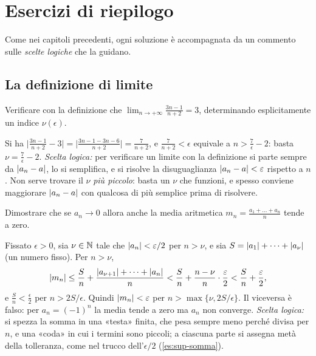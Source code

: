\section{Esercizi di riepilogo}
\label{sec:esercizi-cap3}

Come nei capitoli precedenti, ogni soluzione è accompagnata da un commento sulle
\emph{scelte logiche} che la guidano.

\subsection*{La definizione di limite}

\begin{esercizio}
Verificare con la definizione che $\displaystyle\lim_{n\to+\infty}\frac{3n-1}{n+2}=3$,
determinando esplicitamente un indice $\nu(\epsilon)$.
\begin{soluzione}
Si ha $\bigl|\frac{3n-1}{n+2}-3\bigr|=\bigl|\frac{3n-1-3n-6}{n+2}\bigr|=\frac7{n+2}$, e
$\frac7{n+2}<\epsilon$ equivale a $n>\frac7\epsilon-2$: basta $\nu=\frac7\epsilon-2$.
\emph{Scelta logica:} per verificare un limite con la definizione si parte sempre da
$\lvert a_{n}-a\rvert$, lo si semplifica, e si risolve la disuguaglianza $\lvert a_{n}-a\rvert<\varepsilon$
rispetto a $n$. Non serve trovare il $\nu$ \emph{più piccolo}: basta un $\nu$ che funzioni,
e spesso conviene maggiorare $\lvert a_{n}-a\rvert$ con qualcosa di più semplice prima di
risolvere.
\end{soluzione}
\end{esercizio}

\begin{esercizio}
Dimostrare che se $a_{n}\to0$ allora anche la media aritmetica
$m_{n}=\frac{a_{1}+\dots+a_{n}}{n}$ tende a zero.
\begin{soluzione}
Fissato $\epsilon>0$, sia $\nu\in\mathbb{N}$ tale che $\lvert a_{n}\rvert<\varepsilon/2$ per $n>\nu$, e sia
$S=\lvert a_{1}\rvert+\dots+\lvert a_{\nu}\rvert$ (un numero fisso). Per $n>\nu$,
\[
  \lvert m_{n}\rvert\le\frac{S}{n}+\frac{\lvert a_{\nu+1}\rvert+\dots+\lvert a_{n}\rvert}{n}
  <\frac Sn+\frac{n-\nu}{n}\cdot\frac{\varepsilon}2<\frac Sn+\frac{\varepsilon}2,
\]
e $\frac Sn<\frac\epsilon2$ per $n>2S/\epsilon$. Quindi $\lvert m_{n}\rvert<\varepsilon$ per
$n>\max\{\nu,2S/\epsilon\}$. Il viceversa è falso: per $a_{n}=(-1)^{n}$ la media tende a
zero ma $a_{n}$ non converge. \emph{Scelta logica:} si spezza la somma in una «testa»
finita, che pesa sempre meno perché divisa per $n$, e una «coda» in cui i termini sono
piccoli; a ciascuna parte si assegna metà della tolleranza, come nel trucco
dell'$\epsilon/2$ (\cref{es:sup-somma}).
\end{soluzione}
\end{esercizio}

